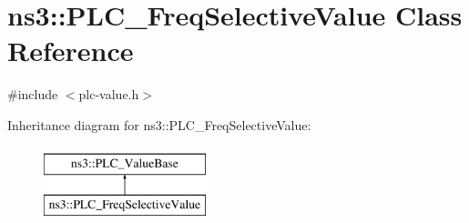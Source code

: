 \hypertarget{classns3_1_1PLC__FreqSelectiveValue}{\section{ns3\-:\-:\-P\-L\-C\-\_\-\-Freq\-Selective\-Value \-Class \-Reference}
\label{classns3_1_1PLC__FreqSelectiveValue}
}


{\ttfamily \#include $<$plc-\/value.\-h$>$}

\-Inheritance diagram for ns3\-:\-:\-P\-L\-C\-\_\-\-Freq\-Selective\-Value\-:\begin{figure}[H]
\begin{center}
\leavevmode
\includegraphics[height=2.000000cm]{classns3_1_1PLC__FreqSelectiveValue}
\end{center}
\end{figure}
